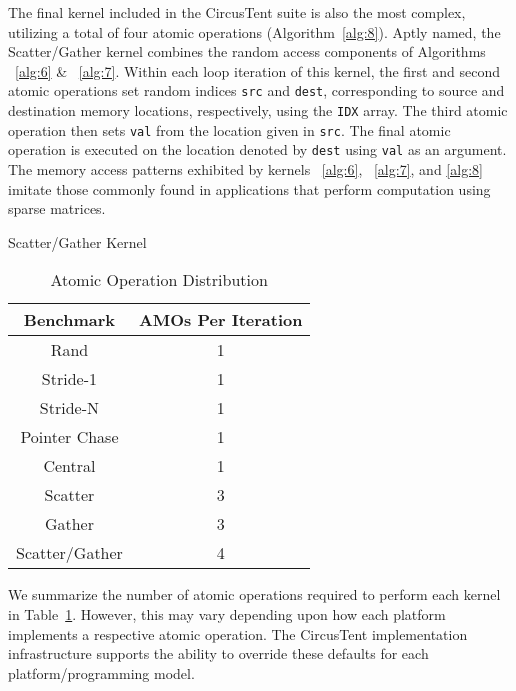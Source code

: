The final kernel included in the CircusTent suite is also the most complex, utilizing a total of four atomic operations (Algorithm~\ref{alg:8}).
Aptly named, the Scatter/Gather kernel combines the random access components of Algorithms ~\ref{alg:6} \& ~\ref{alg:7}.
Within each loop iteration of this kernel, the first and second atomic operations set random indices \texttt{src} and \texttt{dest}, corresponding to source and destination memory locations, respectively, using the \texttt{IDX} array.
The third atomic operation then sets \texttt{val} from the location given in \texttt{src}.
The final atomic operation is executed on the location denoted by \texttt{dest} using \texttt{val} as an argument.
The memory access patterns exhibited by kernels ~\ref{alg:6}, ~\ref{alg:7}, and \ref{alg:8} imitate those commonly found in applications that perform computation using sparse matrices.

\begin{algorithm}
\SetAlgoLined
{}
\caption{Scatter/Gather Kernel}
\label{alg:8}
\end{algorithm}  

\begin{table}
  \caption{Atomic Operation Distribution}
  \label{tab:amodistro}
  \begin{tabular}{cc}
    \toprule
    Benchmark&AMOs Per Iteration\\
    \midrule
   Rand & 1\\
   Stride-1 & 1\\
   Stride-N & 1\\
   Pointer Chase & 1\\
   Central & 1\\
   Scatter & 3\\
   Gather & 3\\
   Scatter/Gather & 4\\
  \bottomrule
\end{tabular}
\end{table}

We summarize the number of atomic operations required to perform each kernel in Table~\ref{tab:amodistro}.
However, this may vary depending upon how each platform implements a respective atomic operation.
The CircusTent implementation infrastructure supports the ability to override these defaults for each platform/programming model.

